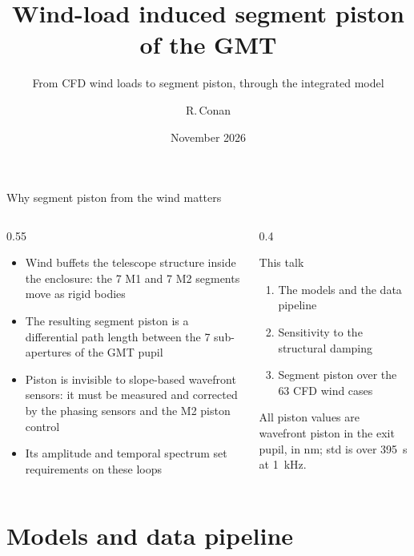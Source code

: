 \documentclass[10pt,aspectratio=169]{beamer}
\title{Wind-load induced segment piston of the GMT}
\subtitle{From CFD wind loads to segment piston, through the integrated model}
\author{R.\,Conan}
\institute{GMTO integrated modeling}
\date{November 2026}
\begin{document}
\maketitle

\begin{frame}{Why segment piston from the wind matters}
  \begin{columns}[T]
    \begin{column}{0.55\textwidth}
      \small
      \begin{itemize}
        \item Wind buffets the telescope structure inside the enclosure: the 7 M1 and 7 M2 segments move as rigid bodies
        \item The resulting \alert{segment piston} is a differential path length between the 7 sub-apertures of the GMT pupil
        \item Piston is invisible to slope-based wavefront sensors: it must be measured and corrected by the phasing sensors and the M2 piston control
        \item Its amplitude and temporal spectrum set requirements on these loops
      \end{itemize}
    \end{column}
    \begin{column}{0.4\textwidth}
      \begin{block}{This talk}
        \begin{enumerate}
          \item The models and the data pipeline
          \item Sensitivity to the structural damping
          \item Segment piston over the 63 CFD wind cases
        \end{enumerate}
      \end{block}
      \vspace{2mm}
      {\small All piston values are \alert{wavefront} piston in the exit pupil, in nm; std is over \SI{395}{s} at \SI{1}{kHz}.}
    \end{column}
  \end{columns}
\end{frame}

\section{Models and data pipeline}
\end{document}
